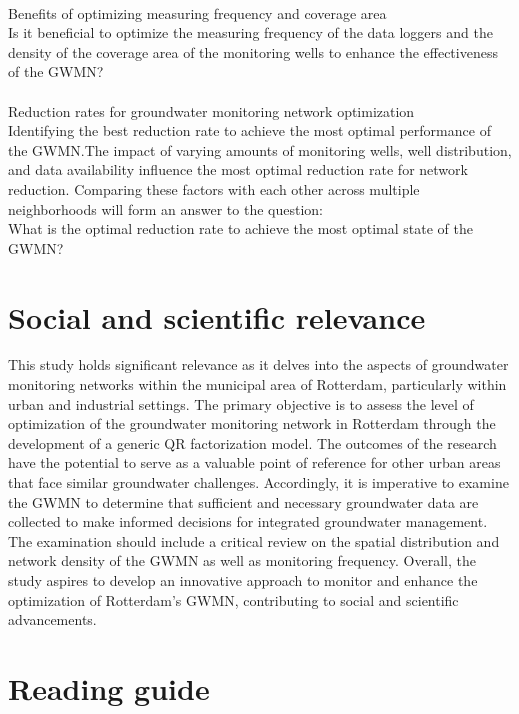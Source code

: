 \\
Benefits of optimizing measuring frequency and coverage area\\
Is it beneficial to optimize the measuring frequency of the data loggers and the density of the coverage area of the monitoring wells to enhance the effectiveness of the GWMN?\\
\\
Reduction rates for groundwater monitoring network optimization\\
Identifying the best reduction rate to achieve the most optimal performance of the GWMN.The impact of varying amounts of monitoring wells, well distribution, and data availability influence the most optimal reduction rate for network reduction. Comparing these factors with each other across multiple neighborhoods will form an answer to the question: \\
What is the optimal reduction rate to achieve the most optimal state of the GWMN?

\section{Social and scientific relevance}

This study holds significant relevance as it delves into the aspects of groundwater monitoring networks within the municipal area of Rotterdam, particularly within urban and industrial settings. The primary objective is to assess the level of optimization of the groundwater monitoring network in Rotterdam through the development of a generic QR factorization model. The outcomes of the research have the potential to serve as a valuable point of reference for other urban areas that face similar groundwater challenges. Accordingly, it is imperative to examine the GWMN to determine that sufficient and necessary groundwater data are collected to make informed decisions for integrated groundwater management. The examination should include a critical review on the spatial distribution and network density of the GWMN as well as monitoring frequency. Overall, the study aspires to develop an innovative approach to monitor and enhance the optimization of Rotterdam’s GWMN, contributing to social and scientific advancements. 

\section{Reading guide}

